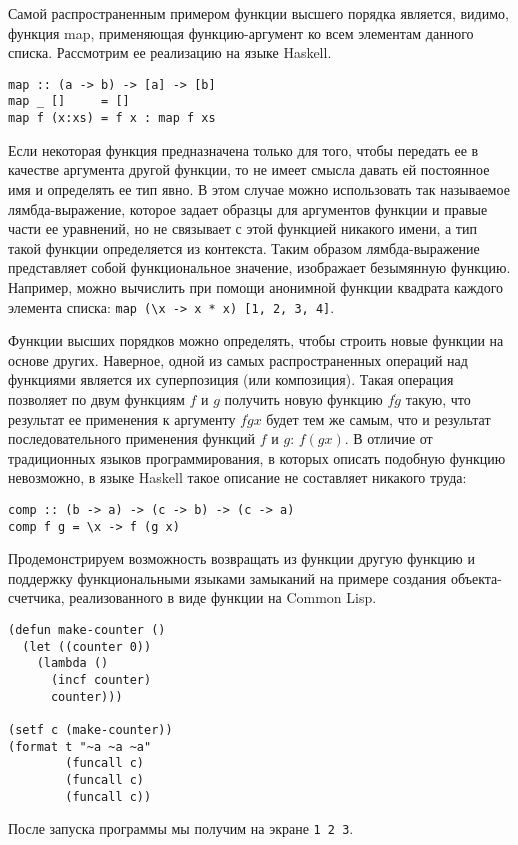 Самой распространенным примером функции высшего порядка является,
видимо, функция map, применяющая функцию-аргумент ко всем элементам
данного списка. Рассмотрим ее реализацию на языке Haskell.

\begin{verbatim}
map :: (a -> b) -> [a] -> [b]
map _ []     = []
map f (x:xs) = f x : map f xs
\end{verbatim}


Если некоторая функция предназначена только для того, чтобы передать
ее в качестве аргумента другой функции, то не имеет смысла давать ей
постоянное имя и определять ее тип явно. В этом случае можно
использовать так называемое лямбда-выражение, которое задает образцы
для аргументов функции и правые части ее уравнений, но не связывает с
этой функцией никакого имени, а тип такой функции определяется из
контекста. Таким образом лямбда-выражение представляет собой
функциональное значение, изображает безымянную функцию. Например,
можно вычислить при помощи анонимной функции квадрата каждого
элемента списка: \verb|map (\x -> x * x) [1, 2, 3, 4]|.

Функции высших порядков можно определять, чтобы строить новые функции
на основе других. Наверное, одной из самых распространенных операций
над функциями является их суперпозиция (или композиция). Такая
операция позволяет по двум функциям $f$ и $g$ получить новую функцию
$f \dot g$ такую, что результат ее применения к аргументу $f\dot g x$
будет тем же самым, что и результат последовательного применения
функций $f$ и $g$: $f (g x)$. В отличие от традиционных языков
программирования, в которых описать подобную функцию невозможно, в
языке Haskell такое описание не составляет никакого труда:

\begin{verbatim}
comp :: (b -> a) -> (c -> b) -> (c -> a)
comp f g = \x -> f (g x)
\end{verbatim}

Продемонстрируем возможность возвращать из функции другую функцию
и поддержку функциональными языками замыканий на примере создания
объекта-счетчика, реализованного в виде функции на Common Lisp.

\begin{verbatim}
(defun make-counter ()
  (let ((counter 0))
    (lambda ()
      (incf counter)
      counter)))

(setf c (make-counter))
(format t "~a ~a ~a"
        (funcall c)
        (funcall c)
        (funcall c))
\end{verbatim}
После запуска программы мы получим на экране \verb|1 2 3|.

